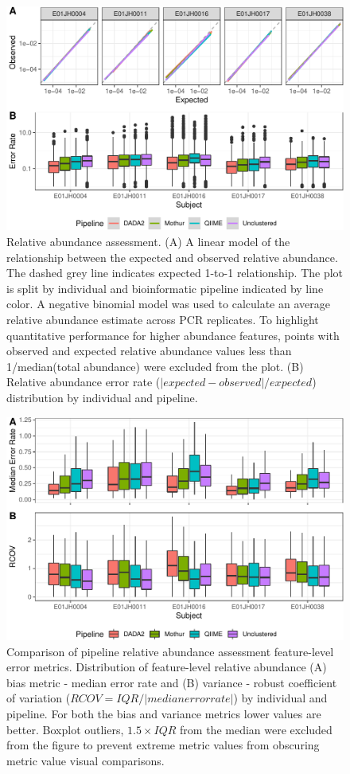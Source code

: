 \documentclass[linenumbers]{bmcart}
\begin{document}
\begin{figure}
\centering
\includegraphics{relAbuError-1.pdf}
\caption{\label{fig:relAbuError}Relative abundance assessment. (A) A linear model of the relationship between the expected and observed relative
abundance. The dashed grey line indicates expected 1-to-1 relationship.
The plot is split by individual and bioinformatic pipeline indicated by line color. A negative binomial model was used to
calculate an average relative abundance estimate across PCR
replicates. To highlight quantitative performance for higher abundance features, points with observed and expected relative abundance values less than 1/median(total abundance) were excluded from the plot.
(B) Relative abundance error rate (\(|expected - observed|/expected\)) distribution by individual and pipeline.}
\end{figure}

\begin{figure}
\centering
\includegraphics{relAbuErrorMetrics-1.pdf}
\caption{\label{fig:relAbuErrorMetrics}Comparison of pipeline relative
abundance assessment feature-level error metrics. Distribution of
feature-level relative abundance (A) bias metric - median error rate and
(B) variance - robust coefficient of variation (\(RCOV=IQR/|median error rate|\)) by individual and pipeline.
For both the bias and variance metrics lower values are better.
Boxplot outliers, \(1.5\times IQR\) from the median were excluded from the figure to prevent extreme metric values
from obscuring metric value visual comparisons.}
\end{figure}
\end{document}
